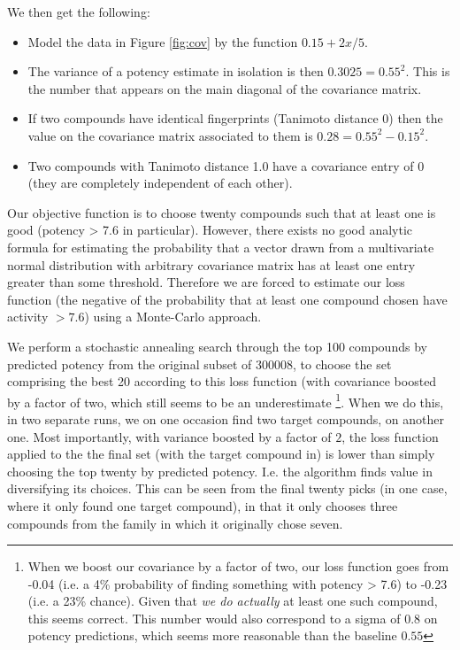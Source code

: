 \documentclass[journal=jacsat,manuscript=article]{achemso}
\begin{document}
We then get the following:
\begin{itemize}
    \item Model the data in Figure \ref{fig:cov} by the function $0.15 + 2x/5$.
    \item The variance of a potency estimate in isolation is then $0.3025 = 0.55^2$.  This is the number that appears on the main diagonal of the covariance matrix.
    \item If two compounds have identical fingerprints (Tanimoto distance 0) then the value on the covariance matrix associated to them is $0.28 = 0.55^2 - 0.15^2$.
    \item Two compounds with Tanimoto distance 1.0 have a covariance entry of 0 (they are completely independent of each other).
\end{itemize}


Our objective function is to choose twenty compounds such that at least one is good (potency > 7.6 in particular).  However, there exists no good analytic formula for estimating the probability that a vector drawn from a multivariate normal distribution with arbitrary covariance matrix has at least one entry greater than some threshold.  Therefore we are forced to estimate our loss function (the negative of the probability that at least one compound chosen have activity $> 7.6$) using a Monte-Carlo approach.

We perform a stochastic annealing search through the top 100 compounds by predicted potency from the original subset of 300008, to choose the set comprising the best 20 according to this loss function (with covariance boosted by a factor of two, which still seems to be an underestimate \footnote{When we boost our covariance by a factor of two, our loss function goes from -0.04 (i.e. a 4\% probability of finding something with potency > 7.6) to -0.23 (i.e. a 23\% chance).  Given that \textit{we do actually} at least one such compound, this seems correct.  This number would also correspond to a sigma of $0.8$ on potency predictions, which seems more reasonable than the baseline $0.55$}.  When we do this, in two separate runs, we on one occasion find two target compounds, on another one.  Most importantly, with variance boosted by a factor of $2$, the loss function applied to the the final set (with the target compound in) is lower than simply choosing the top twenty by predicted potency.  I.e. the algorithm finds value in diversifying its choices.  This can be seen from the final twenty picks (in one case, where it only found one target compound), in that it only chooses three compounds from the family in which it originally chose seven.
\end{document}
